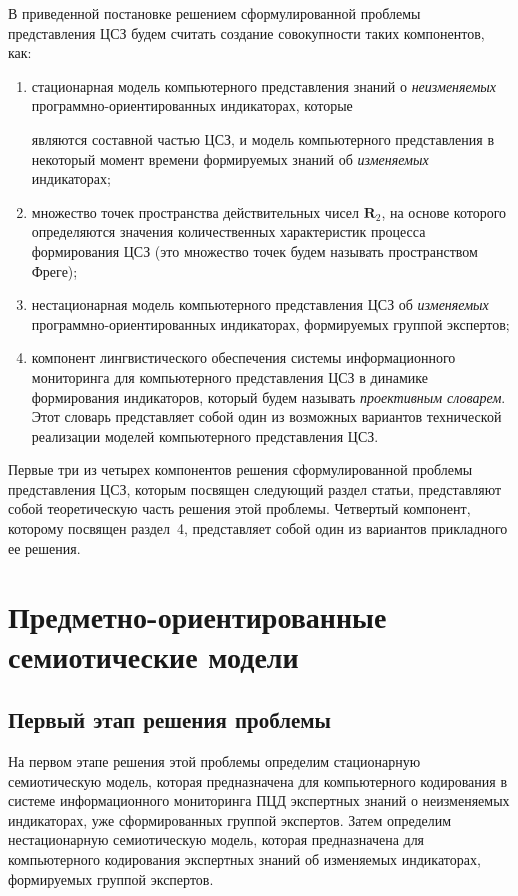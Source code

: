 \begin{multicols}{2}
   В приведенной постановке решением сформулированной проблемы представления ЦСЗ 
будем считать создание совокупности таких компонентов, как:
   \begin{enumerate}[(1)]
\item стационарная модель компьютерного пред\-став\-ле\-ния знаний о \textit{неизменяемых} 
про\-грам\-мно-ори\-ен\-ти\-ро\-ван\-ных индикаторах, которые\linebreak\vspace*{-12pt}

\pagebreak

\noindent
 являются составной частью ЦСЗ, и 
модель компьютерного представления в некоторый момент времени формируемых знаний об 
\textit{изменяемых} индикаторах;
   \item множество точек пространства действительных чисел $\mathbf{R}_2$, на основе 
которого определяются значения количественных характеристик процесса формирования 
ЦСЗ (это множество точек будем называть пространством Фреге);
   \item нестационарная модель компьютерного представления ЦСЗ об \textit{изменяемых} 
программно-ори\-ен\-ти\-ро\-ван\-ных индикаторах, формируемых группой экспертов;
   \item компонент лингвистического обеспечения сис\-те\-мы информационного мониторинга 
для компьютерного представления ЦСЗ в динамике формирования индикаторов, который 
будем называть \textit{проективным словарем}. Этот словарь представляет собой один из 
возможных вариантов технической реализации моделей компьютерного представления ЦСЗ.
   \end{enumerate}
   
   Первые три из четырех компонентов решения сформулированной проблемы 
представления ЦСЗ, которым посвящен следующий раздел статьи, представляют собой 
теоретическую часть решения этой проблемы. Четвертый компонент, которому посвящен 
раздел~4, представляет собой один из вариантов прикладного ее решения.

\section{Предметно-ориентированные семиотические модели}

   \subsection{Первый этап решения проблемы} %
   
   На первом этапе решения этой проблемы определим стационарную семиотическую 
модель, которая предназначена для компьютерного кодирования в системе 
информационного мониторинга ПЦД экспертных знаний о неизменяемых индикаторах, уже 
сформированных группой экспертов. Затем определим нестационарную семиотическую 
модель, которая предназначена для компьютерного кодирования экспертных знаний об 
изменяемых индикаторах, формируемых группой экспертов.
   

\end{multicols}
